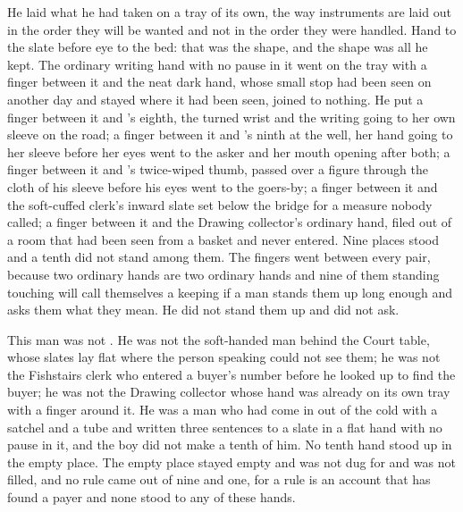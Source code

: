 \scenebreak

He laid what he had taken on a tray of its own, the way instruments are laid out in the order they will be wanted and not in the order they were handled. Hand to the slate before eye to the bed: that was the shape, and the shape was all he kept. The ordinary writing hand with no pause in it went on the tray with a finger between it and the neat dark hand, whose small stop had been seen on another day and stayed where it had been seen, joined to nothing. He put a finger between it and 's eighth, the turned wrist and the writing going to her own sleeve on the road; a finger between it and 's ninth at the well, her hand going to her sleeve before her eyes went to the asker and her mouth opening after both; a finger between it and 's twice-wiped thumb, passed over a figure through the cloth of his sleeve before his eyes went to the goers-by; a finger between it and the soft-cuffed clerk's inward slate set below the bridge for a measure nobody called; a finger between it and the Drawing collector's ordinary hand, filed out of a room that had been seen from a basket and never entered. Nine places stood and a tenth did not stand among them. The fingers went between every pair, because two ordinary hands are two ordinary hands and nine of them standing touching will call themselves a keeping if a man stands them up long enough and asks them what they mean. He did not stand them up and did not ask.

This man was not . He was not the soft-handed man behind the Court table, whose slates lay flat where the person speaking could not see them; he was not the Fishstairs clerk who entered a buyer's number before he looked up to find the buyer; he was not the Drawing collector whose hand was already on its own tray with a finger around it. He was a man who had come in out of the cold with a satchel and a tube and written three sentences to a slate in a flat hand with no pause in it, and the boy did not make a tenth of him. No tenth hand stood up in the empty place. The empty place stayed empty and was not dug for and was not filled, and no rule came out of nine and one, for a rule is an account that has found a payer and none stood to any of these hands.

